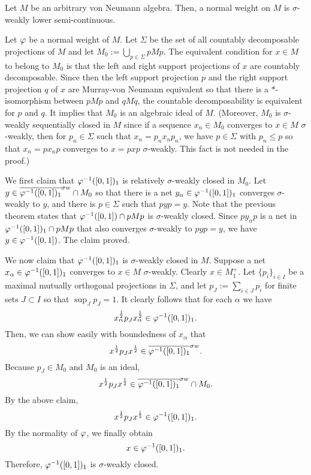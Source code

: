 \documentclass{../../small}
\begin{document}
\begin{thm}
Let $M$ be an arbitrary von Neumann algebra.
Then, a normal weight on $M$ is $\sigma$-weakly lower semi-continuous.
\end{thm}
\begin{pf}
Let $\varphi$ be a normal weight of $M$.
Let $\Sigma$ be the set of all countably decomposable projections of $M$ and let $M_0:=\bigcup_{p\in\Sigma}pMp$.
The equivalent condition for $x\in M$ to belong to $M_0$ is that the left and right support projections of $x$ are countably decomposable.
Since then the left support projection $p$ and the right support projection $q$ of $x$ are Murray-von Neumann equivalent so that there is a $*$-isomorphism between $pMp$ and $qMq$, the countable decomposability is equivalent for $p$ and $q$.
It implies that $M_0$ is an algebraic ideal of $M$.
(Moreover, $M_0$ is $\sigma$-weakly sequentially closed in $M$ since if a sequence $x_n\in M_0$ converges to $x\in M$ $\sigma$-weakly, then for $p_n\in\Sigma$ such that $x_n=p_nx_np_n$, we have $p\in\Sigma$ with $p_n\le p$ so that $x_n=px_np$ converges to $x=pxp$ $\sigma$-weakly.
This fact is not needed in the proof.)

We first claim that $\varphi^{-1}([0,1])_1$ is relatively $\sigma$-weakly closed in $M_0$.
Let $y\in\overline{\varphi^{-1}([0,1])_1}^{\sigma w}\cap M_0$ so that there is a net $y_\alpha\in\varphi^{-1}([0,1])_1$ converges $\sigma$-weakly to $y$, and there is $p\in\Sigma$ such that $pyp=y$.
Note that the previous theorem states that $\varphi^{-1}([0,1])\cap pMp$ is $\sigma$-weakly closed.
Since $py_\alpha p$ is a net in $\varphi^{-1}([0,1])_1\cap pMp$ that also converges $\sigma$-weakly to $pyp=y$, we have $y\in\varphi^{-1}([0,1])$.
The claim proved.

We now claim that $\varphi^{-1}([0,1])_1$ is $\sigma$-weakly closed in $M$.
Suppose a net $x_\alpha\in\varphi^{-1}([0,1])_1$ converges to $x\in M$ $\sigma$-weakly.
Clearly $x\in M_1^+$.
Let $\{p_i\}_{i\in I}$ be a maximal mutually orthogonal projections in $\Sigma$, and let $p_J:=\sum_{i\in J}p_i$ for finite sets $J\subset I$ so that $\sup_Jp_J=1$.
It clearly follows that for each $\alpha$ we have
\[x_\alpha^{\frac12}p_Jx_\alpha^{\frac12}\in\varphi^{-1}([0,1])_1.\]
Then, we can show easily with boundedness of $x_\alpha$ that
\[x^{\frac12}p_Jx^{\frac12}\in\overline{\varphi^{-1}([0,1])_1}^{\sigma w}.\]
Because $p_J\in M_0$ and $M_0$ is an ideal, 
\[x^{\frac12}p_Jx^{\frac12}\in\overline{\varphi^{-1}([0,1])_1}^{\sigma w}\cap M_0.\]
By the above claim,
\[x^{\frac12}p_Jx^{\frac12}\in\varphi^{-1}([0,1])_1.\]
By the normality of $\varphi$, we finally obtain
\[x\in\varphi^{-1}([0,1])_1.\]
Therefore, $\varphi^{-1}([0,1])_1$ is $\sigma$-weakly closed.
\end{pf}
\end{document}
